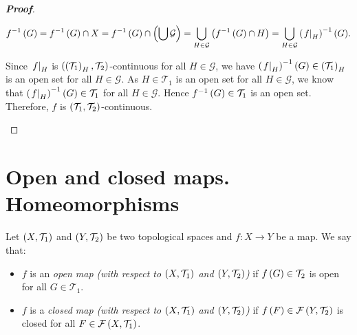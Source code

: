 \begin{theorem}
\begin{proof}[\rm\textbf{Proof}]
\begin{enumerate}
      \begin{equation}
        f^{-1}\left(G\right)=f^{-1}\left(G\right)\cap X=f^{-1}\left(G\right)\cap\left(\bigcup{\mathcal{G}}\right)=\bigcup_{H\in\mathcal{G}}{\left(f^{-1}\left(G\right)\cap H\right)}=\bigcup_{H\in\mathcal{G}}{\left(\left.f\right|_{H}\right)^{-1}\left(G\right)}.
      \end{equation}

      Since $\left.f\right|_{H}$ is $\left(\left(\mathcal{T}_1\right)_H,\mathcal{T}_2\right)$-continuous for all $H\in\mathcal{G}$, we have $\left(\left.f\right|_{H}\right)^{-1}\left(G\right)\in\left(\mathcal{T}_1\right)_H$ is an open set for all $H\in\mathcal{G}$. As $H\in\mathcal{T}_1$ is an open set for all $H\in\mathcal{G}$, we know that $\left(\left.f\right|_{H}\right)^{-1}\left(G\right)\in\mathcal{T}_1$ for all $H\in\mathcal{G}$. Hence $f^{-1}\left(G\right)\in\mathcal{T}_1$ is an open set. Therefore, $f$ is $\left(\mathcal{T}_1,\mathcal{T}_2\right)$-continuous.
    \end{enumerate}
  \end{proof}
\end{theorem}

\section{Open and closed maps. Homeomorphisms}

\begin{definition}
  Let $\left(X,\mathcal{T}_1\right)$ and $\left(Y,\mathcal{T}_2\right)$ be two topological spaces and $f:X\rightarrow Y$ be a map. We say that:

  \begin{itemize}
    \item $f$ is an \textit{open map (with respect to $\left(X,\mathcal{T}_1\right)$ and $\left(Y,\mathcal{T}_2\right)$)} if $f\left(G\right)\in\mathcal{T}_2$ is open for all $G\in\mathcal{T}_1$.
    \item $f$ is a \textit{closed map (with respect to $\left(X,\mathcal{T}_1\right)$ and $\left(Y,\mathcal{T}_2\right)$)} if $f\left(F\right)\in\mathcal{F}\left(Y,\mathcal{T}_2\right)$ is closed for all $F\in\mathcal{F}\left(X,\mathcal{T}_1\right)$.
  \end{itemize}
\end{definition}

